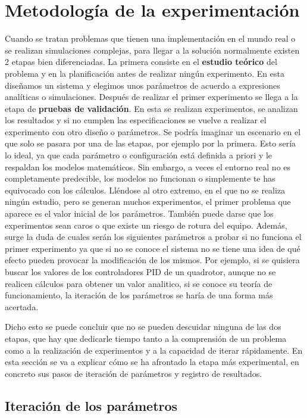 \section{Metodología de la experimentación} 
Cuando se tratan problemas que tienen una implementación en el mundo real o se realizan simulaciones complejas, para llegar a la solución normalmente existen 2 etapas bien diferenciadas. La primera consiste en el \textbf{estudio teórico} del problema y en la planificación antes de realizar ningún experimento. En esta diseñamos un sistema y elegimos unos parámetros de acuerdo a expresiones analíticas o simulaciones. Después de realizar el primer experimento se llega a la etapa de \textbf{pruebas de validación}. En esta se realizan experimentos, se analizan los resultados y si no cumplen las especificaciones se vuelve a realizar el experimento con otro diseño o parámetros.    
Se podría imaginar un escenario en el que solo se pasara por una de las etapas, por ejemplo por la primera. Esto sería lo ideal, ya que cada parámetro o configuración está definida a priori y le respaldan los modelos matemáticos. Sin embargo, a veces el entorno real no es completamente predecible, los modelos no funcionan o simplemente te has equivocado con los cálculos. 
Lléndose al otro extremo, en el que no se realiza ningún estudio, pero se generan muchos experimentos, el primer problema que aparece es el valor inicial de los parámetros. También  puede darse que los experimentos sean caros o que existe un riesgo de rotura del equipo. Además, surge la duda de cuales serán los siguientes parámetros a probar si no funciona el primer experimento ya que si no se conoce el sistema no se tiene una idea de qué efecto pueden provocar la modificación de los mismos. 
Por ejemplo, si se quisiera buscar los valores de los controladores PID de un quadrotor, aunque no se realicen cálculos para obtener un valor analitico, si se conoce su teoría de funcionamiento, la iteración de los parámetros se haría de una forma más acertada.

Dicho esto se puede concluir que no se pueden descuidar ninguna de las dos etapas, que hay que dedicarle tiempo tanto a la comprensión de un problema como a la realización de experimentos y a la capacidad de iterar rápidamente. En esta sección se va a explicar cómo se ha afrontado la etapa más experimental, en concreto sus pasos de iteración de parámetros y registro de resultados.


\subsection{Iteración de los parámetros}

